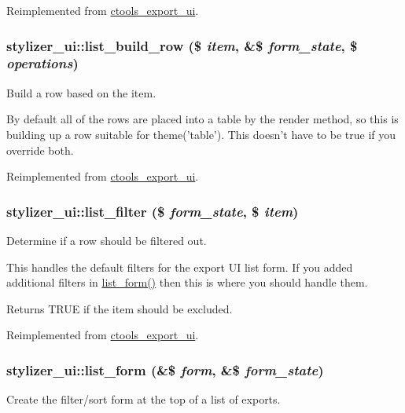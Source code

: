 Reimplemented from \hyperlink{classctools__export__ui_a6e2c9b8dca7d4f8ec8d7badaa1b51f48}{ctools\_\-export\_\-ui}.\hypertarget{classstylizer__ui_a37d2a02c59128507bb6e811b97de3f06}{
\subsubsection[{list\_\-build\_\-row}]{\setlength{\rightskip}{0pt plus 5cm}stylizer\_\-ui::list\_\-build\_\-row (\$ {\em item}, \/  \&\$ {\em form\_\-state}, \/  \$ {\em operations})}}
\label{classstylizer__ui_a37d2a02c59128507bb6e811b97de3f06}
Build a row based on the item.

By default all of the rows are placed into a table by the render method, so this is building up a row suitable for theme('table'). This doesn't have to be true if you override both. 

Reimplemented from \hyperlink{classctools__export__ui_ad72f3d7170f48e0d0cb1dacb2926bb78}{ctools\_\-export\_\-ui}.\hypertarget{classstylizer__ui_aa964e50e906437af99898cbc222a3b22}{
\subsubsection[{list\_\-filter}]{\setlength{\rightskip}{0pt plus 5cm}stylizer\_\-ui::list\_\-filter (\$ {\em form\_\-state}, \/  \$ {\em item})}}
\label{classstylizer__ui_aa964e50e906437af99898cbc222a3b22}
Determine if a row should be filtered out.

This handles the default filters for the export UI list form. If you added additional filters in \hyperlink{classstylizer__ui_a9a8b030c4fb9ad963152c8381a76b075}{list\_\-form()} then this is where you should handle them.

\begin{DoxyReturn}{Returns}
TRUE if the item should be excluded. 
\end{DoxyReturn}


Reimplemented from \hyperlink{classctools__export__ui_aed7f3b1a8d7564168f89e2b450c6aa4a}{ctools\_\-export\_\-ui}.\hypertarget{classstylizer__ui_a9a8b030c4fb9ad963152c8381a76b075}{
\subsubsection[{list\_\-form}]{\setlength{\rightskip}{0pt plus 5cm}stylizer\_\-ui::list\_\-form (\&\$ {\em form}, \/  \&\$ {\em form\_\-state})}}
\label{classstylizer__ui_a9a8b030c4fb9ad963152c8381a76b075}
Create the filter/sort form at the top of a list of exports.

